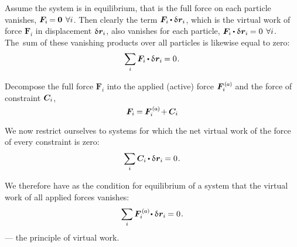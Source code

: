 Assume the system is in equilibrium, that is the full force on each particle vanishes, ${\bm{F}_i \hspace{-0.2ex} = \hspace{-0.1ex} {\bm{0}} \hspace{.4em} \forall i}$.
Then clearly the term ${\bm{F}_i \hspace{-0.1ex} \dotp \variation{\hspace{.1ex}\locationvector_i}}$, which is the virtual work of force ${\bm{F}_i}$ in displacement ${\variation{\hspace{.1ex}\locationvector_i}}$, also vanishes for each particle, ${\bm{F}_i \hspace{-0.1ex} \dotp \variation{\hspace{.1ex}\locationvector_i} \hspace{-0.1ex} = 0 \hspace{.4em} \forall i}$.
The~sum of these vanishing products over all particles is likewise equal to zero:
\[
\displaystyle\sum_{\smash{i}} \bm{F}_i \hspace{-0.1ex} \dotp \variation{\hspace{.1ex}\locationvector_i} \hspace{-0.1ex} = 0
\hspace{.15ex} .
\]

Decompose
the full force ${\bm{F}_i}$
into the applied (active) force $\activeforcewithindex{i}$
and the force of constraint $\bm{C}_{i}$,
\[
\bm{F}_i \hspace{-0.1ex} = \hspace{-0.1ex} \activeforcewithindex{i} \hspace{-0.2ex} + \hspace{-0.1ex} \constraintforcewithindex{i}
\]

We now restrict ourselves to systems for which the net virtual work of the force of every constraint is zero:
\[
\displaystyle\sum_{\smash{i}} \constraintforcewithindex{i} \hspace{-0.1ex} \dotp \variation{\hspace{.1ex}\locationvector_i} \hspace{-0.1ex} = 0
\hspace{.15ex} .
\]

We therefore have as the condition for equilibrium of a system that the virtual work of all applied forces vanishes:
\[
\displaystyle\sum_{\smash{i}} \activeforcewithindex{i} \hspace{-0.25ex} \dotp \variation{\hspace{.1ex}\locationvector_i} \hspace{-0.1ex} = 0
\hspace{.15ex} .
\]
--- the principle of virtual work.

